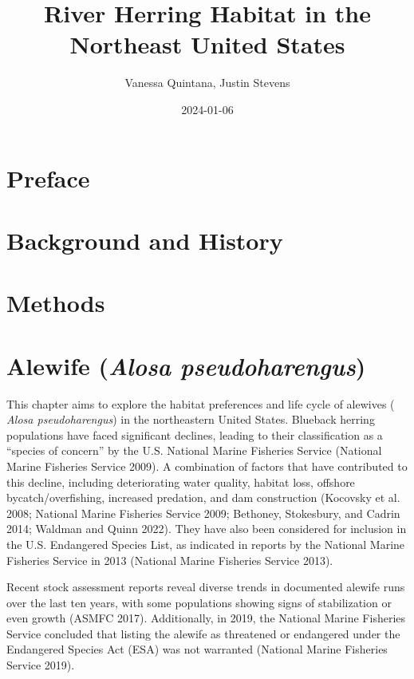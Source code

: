\documentclass[
]{book}
\title{River Herring Habitat in the Northeast United States}
\author{Vanessa Quintana, Justin Stevens}
\date{2024-01-06}
\begin{document}
\maketitle

{
\setcounter{tocdepth}{1}
\tableofcontents
}
\hypertarget{preface}{%
\chapter{Preface}\label{preface}}

\hypertarget{background-and-history}{%
\chapter{Background and History}\label{background-and-history}}

\hypertarget{cross}{%
\chapter{Methods}\label{cross}}

\hypertarget{alewife-alosa-pseudoharengus}{%
\chapter{\texorpdfstring{Alewife (\emph{Alosa pseudoharengus})}{Alewife (Alosa pseudoharengus)}}\label{alewife-alosa-pseudoharengus}}

This chapter aims to explore the habitat preferences and life cycle of alewives ( \emph{Alosa pseudoharengus}) in the northeastern United States.
Blueback herring populations have faced significant declines, leading to their classification as a ``species of concern'' by the U.S.
National Marine Fisheries Service (National Marine Fisheries Service 2009).
A combination of factors that have contributed to this decline, including deteriorating water quality, habitat loss, offshore bycatch/overfishing, increased predation, and dam construction (Kocovsky et al. 2008; National Marine Fisheries Service 2009; Bethoney, Stokesbury, and Cadrin 2014; Waldman and Quinn 2022).
They have also been considered for inclusion in the U.S.
Endangered Species List, as indicated in reports by the National Marine Fisheries Service in 2013 (National Marine Fisheries Service 2013).

Recent stock assessment reports reveal diverse trends in documented alewife runs over the last ten years, with some populations showing signs of stabilization or even growth (ASMFC 2017).
Additionally, in 2019, the National Marine Fisheries Service concluded that listing the alewife as threatened or endangered under the Endangered Species Act (ESA) was not warranted (National Marine Fisheries Service 2019).
\end{document}
